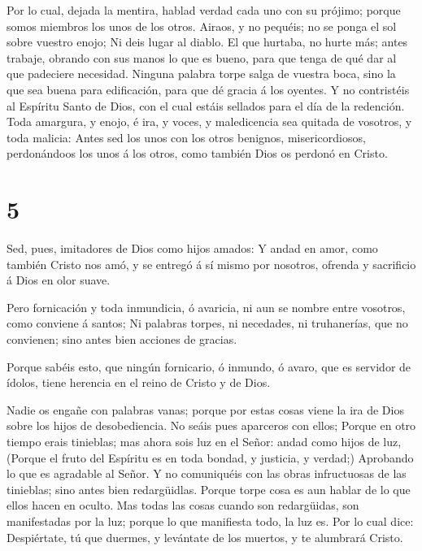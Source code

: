  Por lo cual, dejada la mentira, hablad verdad cada uno con
su prójimo; porque somos miembros los unos de los otros. 
Airaos, y no pequéis; no se ponga el sol sobre vuestro enojo;
 Ni deis lugar al diablo.  El que hurtaba, no
hurte más; antes trabaje, obrando con sus manos lo que es bueno, para
que tenga de qué dar al que padeciere necesidad.  Ninguna
palabra torpe salga de vuestra boca, sino la que sea buena para
edificación, para que dé gracia á los oyentes.  Y no
contristéis al Espíritu Santo de Dios, con el cual estáis sellados para
el día de la redención.  Toda amargura, y enojo, é ira, y
voces, y maledicencia sea quitada de vosotros, y toda malicia:
 Antes sed los unos con los otros benignos,
misericordiosos, perdonándoos los unos á los otros, como también Dios os
perdonó en Cristo.

\hypertarget{section-4}{%
\section{5}\label{section-4}}

 Sed, pues, imitadores de Dios como hijos amados:
 Y andad en amor, como también Cristo nos amó, y se entregó
á sí mismo por nosotros, ofrenda y sacrificio á Dios en olor suave.

 Pero fornicación y toda inmundicia, ó avaricia, ni aun se
nombre entre vosotros, como conviene á santos;  Ni palabras
torpes, ni necedades, ni truhanerías, que no convienen; sino antes bien
acciones de gracias.

 Porque sabéis esto, que ningún fornicario, ó inmundo, ó
avaro, que es servidor de ídolos, tiene herencia en el reino de Cristo y
de Dios.

 Nadie os engañe con palabras vanas; porque por estas cosas
viene la ira de Dios sobre los hijos de desobediencia.  No
seáis pues aparceros con ellos;  Porque en otro tiempo erais
tinieblas; mas ahora sois luz en el Señor: andad como hijos de luz,
 (Porque el fruto del Espíritu es en toda bondad, y
justicia, y verdad;)  Aprobando lo que es agradable al
Señor.  Y no comuniquéis con las obras infructuosas de las
tinieblas; sino antes bien redargüidlas.  Porque torpe cosa
es aun hablar de lo que ellos hacen en oculto.  Mas todas
las cosas cuando son redargüidas, son manifestadas por la luz; porque lo
que manifiesta todo, la luz es.  Por lo cual dice:
Despiértate, tú que duermes, y levántate de los muertos, y te alumbrará
Cristo.

